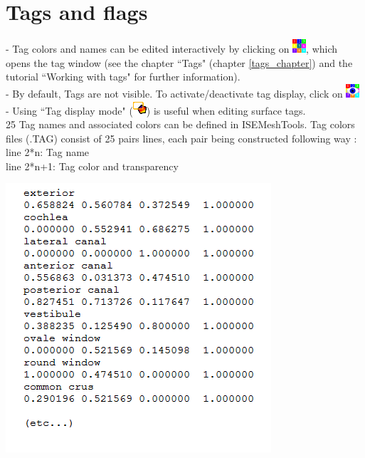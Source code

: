 \section{Tags and flags}

\begin{minipage}{0.55\textwidth}
- Tag colors and names can be edited interactively by
clicking on \includegraphics[scale=0.7]{images/pixmap/Show_Tag_Window2.png}, which opens the tag window (see the chapter
``Tags" (chapter \ref{tags_chapter}) and the tutorial ``Working with tags" for
further information).\\
- By default, Tags are not visible. To activate/deactivate tag
display, click on \includegraphics[scale=0.7]{images/pixmap/Show_Tag_Window.png}\\
- Using ``Tag display mode" (\includegraphics[scale=0.7]{images/pixmap/Tag_select_mode.png}) is useful when editing
surface tags.\\
25 Tag names and associated colors can be defined in ISEMeshTools.
Tag colors files (.TAG) consist of 25 pairs lines,
each pair being constructed following way :\\
line 2*n: Tag name\\
line 2*n+1: Tag color and transparency
\end{minipage}  
 \begin{minipage}{0.45\textwidth}\centering
  \includegraphics[scale=0.5]{images/Icons/Tags.png}
 \end{minipage} 

